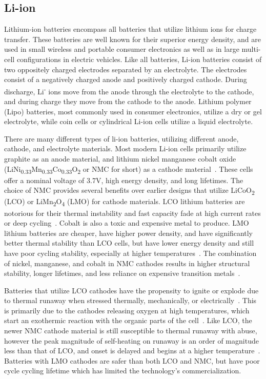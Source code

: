 \subsection{Li-ion}
Lithium-ion batteries encompass all batteries that utilize lithium ions for charge transfer. These batteries are well known for their superior energy density, and are used in small wireless and portable consumer electronics as well as in large multi-cell configurations in electric vehicles.
Like all batteries, Li-ion batteries consist of two oppositely charged electrodes separated by an electrolyte. The electrodes consist of a negatively charged anode and positively charged cathode. During discharge, Li\textsuperscript{-} ions move from the anode through the electrolyte to the cathode, and during charge they move from the cathode to the anode.
Lithium polymer (Lipo) batteries, most commonly used in consumer electronics, utilize a dry or gel electrolyte, while coin cells or cylindrical Li-ion cells utilize a liquid electrolyte. 

There are many different types of li-ion batteries, utilizing different anode, cathode, and electrolyte materials. Most modern Li-ion cells primarily utilize graphite as an anode material, and lithium nickel manganese cobalt oxide
(LiNi\textsubscript{0.33}Mn\textsubscript{0.33}Co\textsubscript{0.33}O\textsubscript{2} or NMC for short) as a cathode material~\cite{nitta2015li}.
These cells offer a nominal voltage of 3.7\si{\volt}, high energy density, and long lifetimes. 
The choice of NMC provides several benefits over earlier designs that utilize 
LiCoO\textsubscript{2} (LCO) or LiMn\textsubscript{2}O\textsubscript{4} (LMO) for cathode materials.
LCO lithium batteries are notorious for their thermal instability and fast capacity fade at high current rates or deep cycling~\cite{nitta2015li}. 
Cobalt is also a toxic and expensive metal to produce. 
LMO lithium batteries are cheaper, have higher power density, and have significantly better thermal stability than LCO cells, but have lower energy density and still have poor cycling stability, especially at higher temperatures~\cite{nitta2015li}.
The combination of nickel, manganese, and cobalt in NMC cathodes results in higher structural stability, longer lifetimes, and less reliance on expensive transition metals~\cite{nitta2015li}. 

Batteries that utilize LCO cathodes have the propensity to ignite or explode due to thermal runaway when stressed thermally, mechanically, or electrically~\cite{doughty2012general}. This is primarily due to the cathodes releasing oxygen at high temperatures, which start an exothermic reaction with the organic parts of the cell~\cite{doughty2012general, nitta2015li}. Like LCO, the newer NMC cathode material is still susceptible to thermal runaway with abuse, however the peak magnitude of self-heating on runaway is an order of magnitude less than that of LCO, and onset is delayed and begins at a higher temperature~\cite{doughty2012general}.
Batteries with LMO cathodes are safer than both LCO and NMC, but have poor cycle cycling lifetime which has limited the technology's commercialization. 

